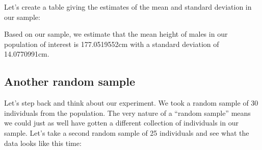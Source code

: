 \documentclass[]{book}
\newenvironment{Shaded}{\begin{snugshade}}{\end{snugshade}}
\newcommand{\CommentTok}[1]{\textcolor[rgb]{0.56,0.35,0.01}{\textit{#1}}}
\newcommand{\DataTypeTok}[1]{\textcolor[rgb]{0.13,0.29,0.53}{#1}}
\newcommand{\KeywordTok}[1]{\textcolor[rgb]{0.13,0.29,0.53}{\textbf{#1}}}
\newcommand{\NormalTok}[1]{#1}
\newcommand{\OperatorTok}[1]{\textcolor[rgb]{0.81,0.36,0.00}{\textbf{#1}}}
\newcommand{\StringTok}[1]{\textcolor[rgb]{0.31,0.60,0.02}{#1}}
\theoremstyle{definition}
\theoremstyle{definition}
\theoremstyle{definition}
\theoremstyle{remark}
\begin{document}
Let's create a table giving the estimates of the mean and standard
deviation in our sample:

\begin{Shaded}
\end{Shaded}

Based on our sample, we estimate that the mean height of males in our
population of interest is 177.0519552cm with a standard deviation of
14.0770991cm.

\hypertarget{another-random-sample}{%
\subsection{Another random sample}\label{another-random-sample}}

Let's step back and think about our experiment. We took a random sample
of 30 individuals from the population. The very nature of a ``random
sample'' means we could just as well have gotten a different collection
of individuals in our sample. Let's take a second random sample of 25
individuals and see what the data looks like this time:
\end{document}
